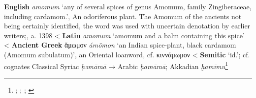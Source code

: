 \begin{etymology}\label{ety:amomum}
\textbf{English} \textit{amomum} `any of several spices of genus Amomum, family Zingiberaceae, including cardamom.', An odoriferous plant. The Amomum of the ancients not being certainly identified, the word was used with uncertain denotation by earlier writers;, a. 1398
< \textbf{Latin} \textit{amomum} `amomum and a balm containing this spice'
< \textbf{Ancient Greek} {ἄμωμον} \textit{ámōmon} `an Indian spice-plant, black cardamom (Amomum subulatum)', an Oriental loanword, cf. κιννάμωμον
< \textbf{Semitic} `id.'; cf. cognates Classical Syriac  \textit{ḥəmāmā} → Arabic  \textit{ḥamāmā}; Akkadian \textit{ḫamīmu}\footnote{\textcite[s.v. amomum]{oed}; \textcite{lewis_latin_1879}; \textcites[]{liddell_greek-english_1940}[97]{beekes_etymological_2010}; \textcites[169]{low_aramaeische_1881}[100]{lev_practical_2008}[vol. 6, p. 66]{roth_assyrian_2004}}
\end{etymology}